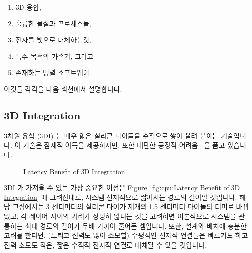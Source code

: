 \begin{enumerate}
\item	3D 융합,
\item	훌륭한 물질과 프로세스들,
\item	전자를 빛으로 대체하는것,
\item	특수 목적의 가속기, 그리고
\item	존재하는 병렬 소프트웨어.
\end{enumerate}

이것들 각각을 다음 섹션에서 설명합니다.

\iffalse
There are nevertheless some technologies (both hardware and software)
that might help improve matters:

\begin{enumerate}
\item	3D integration,
\item	Novel materials and processes,
\item	Substituting light for electricity,
\item	Special-purpose accelerators, and
\item	Existing parallel software.
\end{enumerate}

Each of these is described in one of the following sections.
\fi

\subsection{3D Integration}
\label{sec:cpu:3D Integration}

3차원 융합 (3DI) 는 매우 얇은 실리콘 다이들을 수직으로 쌓아 올려 붙이는
기술입니다.
이 기술은 잠재적 이득을 제공하지만, 또한 대단한 공정적
어려움~\cite{JohnKnickerbocker2008:3DI} 을 품고 있습니다.

\iffalse
3-dimensional integration (3DI) is the practice of bonding
very thin silicon dies to each other in a vertical stack.
This practice provides potential benefits, but also poses
significant fabrication challenges~\cite{JohnKnickerbocker2008:3DI}.
\fi

\begin{figure}[tb]
\centering
{}
\caption{Latency Benefit of 3D Integration}
\label{fig:cpu:Latency Benefit of 3D Integration}
\end{figure}

3DI 가 가져올 수 있는 가장 중요한 이점은 Figure~\ref{fig:cpu:Latency Benefit of
3D Integration} 에 그려진대로, 시스템 전체적으로 짧아지는 경로의 길이일
것입니다.
해당 그림에서는 3 센티미터의 실리콘 다이가 제개의 1.5 센티미터 다이들의 더미로
바뀌었고, 각 레이어 사이의 거리가 상당히 얇다는 것을 고려하면 이론적으로
시스템을 관통하는 최대 경로의 길이가 두배 가까이 줄어든 셈입니다.
또한, 설계와 배치에 충분한 고려를 한다면, (느리고 전력도 많이 소모할) 수평적인
전자적 연결들은 빠르기도 하고 전력 소모도 적은, 짧은 수직적 전자적 연결로
대체될 수 있을 것입니다.

